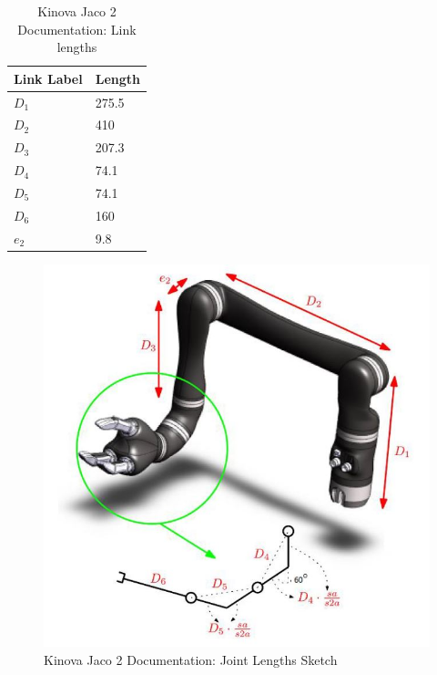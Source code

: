 \documentclass[12pt,openany,a4paper]{book}
\begin{document}
{\begin{center}
\begin{table}[htb]
    \begin{tabular}{| p{5cm} | p{5cm} |}
     \hline
     Link Label & Length  \\ 
     \hline
     $D_1$ & 275.5 \\ 
     \hline
     $D_2$ & 410  \\ 
     \hline
     $D_3$ & 207.3 \\ 				 \hline
     $D_4$ & 74.1 \\ 
     \hline
     $D_5$ & 74.1 \\ 
     \hline
     $D_6$ & 160 \\ 
     \hline
     $e_2$ & 9.8 \\
     \hline
    \end{tabular}
    \caption{ Kinova Jaco 2 Documentation: Link lengths}
\end{table}
\end{center}

\begin{center}
\begin{figure}[htb]
  \includegraphics[width=0.6\linewidth]{jaco_joint_lengths.jpg}
\caption{ Kinova Jaco 2 Documentation: Joint Lengths Sketch \cite{specificationGuide} }
\end{figure}
\end{center}


\vspace{\baselineskip}

}
\end{document}
